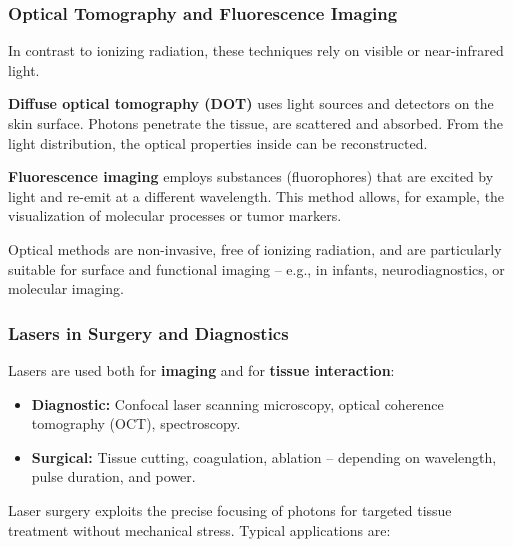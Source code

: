 \subsubsection{Optical Tomography and Fluorescence Imaging}

In contrast to ionizing radiation, these techniques rely on visible or near-infrared light.

\textbf{Diffuse optical tomography (DOT)} uses light sources and detectors on the skin surface. Photons penetrate the tissue, are scattered and absorbed. From the light distribution, the optical properties inside can be reconstructed.

\textbf{Fluorescence imaging} employs substances (fluorophores) that are excited by light and re-emit at a different wavelength. This method allows, for example, the visualization of molecular processes or tumor markers.
\vspace{1em}
\begin{tcolorbox}[didaktikbox, title=Advantage of Optical Methods]
	\label{box:optisches Verfahren}
	\small
	Optical methods are non-invasive, free of ionizing radiation, and are particularly suitable for surface and functional imaging – e.g., in infants, neurodiagnostics, or molecular imaging.
\end{tcolorbox}

\subsubsection{Lasers in Surgery and Diagnostics}

Lasers are used both for \textbf{imaging} and for \textbf{tissue interaction}:

\begin{itemize}
	\item \textbf{Diagnostic:} Confocal laser scanning microscopy, optical coherence tomography (OCT), spectroscopy.
	\item \textbf{Surgical:} Tissue cutting, coagulation, ablation – depending on wavelength, pulse duration, and power.
\end{itemize}

Laser surgery exploits the precise focusing of photons for targeted tissue treatment without mechanical stress. Typical applications are:

